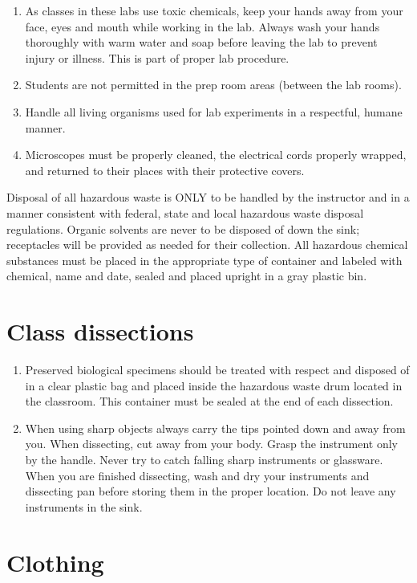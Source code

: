 \documentclass[]{book}
\providecommand{\tightlist}{%
  \setlength{\itemsep}{0pt}\setlength{\parskip}{0pt}}
\begin{document}
\begin{enumerate}
\item
  As classes in these labs use toxic chemicals, keep your hands away
  from your face, eyes and mouth while working in the lab. Always wash
  your hands thoroughly with warm water and soap before leaving the lab
  to prevent injury or illness. This is part of proper lab procedure.
\item
  Students are not permitted in the prep room areas (between the lab
  rooms).
\item
  Handle all living organisms used for lab experiments in a respectful,
  humane manner.
\item
  Microscopes must be properly cleaned, the electrical cords properly
  wrapped, and returned to their places with their protective covers.
\end{enumerate}

Disposal of all hazardous waste is ONLY to be handled by the instructor
and in a manner consistent with federal, state and local hazardous waste
disposal regulations. Organic solvents are never to be disposed of down
the sink; receptacles will be provided as needed for their collection.
All hazardous chemical substances must be placed in the appropriate type
of container and labeled with chemical, name and date, sealed and placed
upright in a gray plastic bin.

\section{Class dissections}\label{class-dissections}

\begin{enumerate}
\def\labelenumi{\arabic{enumi}.}
\setcounter{enumi}{13}
\tightlist
\item
  Preserved biological specimens should be treated with respect and
  disposed of in a clear plastic bag and placed inside the hazardous
  waste drum located in the classroom. This container must be sealed at
  the end of each dissection.
\item
  When using sharp objects always carry the tips pointed down and away
  from you. When dissecting, cut away from your body. Grasp the
  instrument only by the handle. Never try to catch falling sharp
  instruments or glassware. When you are finished dissecting, wash and
  dry your instruments and dissecting pan before storing them in the
  proper location. Do not leave any instruments in the sink.
\end{enumerate}

\section{Clothing}\label{clothing}
\end{document}
